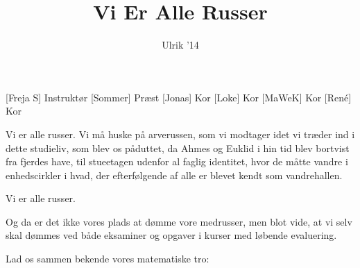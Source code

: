 \documentclass[a4paper,11pt]{article}
\title{Vi Er Alle Russer}
\author{Ulrik '14}
\begin{document}
\maketitle

\begin{roles}
[Freja S] Instruktør
[Sommer] Præst
[Jonas] Kor
[Loke] Kor
[MaWeK] Kor
[René] Kor
\end{roles}


\begin{sketch}


 Vi er alle russer.
Vi må huske på arverussen, som vi modtager idet vi træder ind i dette studieliv, som blev os påduttet, da Ahmes og Euklid i hin tid blev bortvist fra fjerdes have, til stueetagen udenfor al faglig identitet, hvor de måtte vandre i enhedscirkler i hvad, der efterfølgende af alle er blevet kendt som vandrehallen.

 Vi er alle russer.

 Og da er det ikke vores plads at dømme vore medrusser, men blot vide, at vi selv skal dømmes ved både eksaminer og opgaver i kurser med løbende evaluering.

 Lad os sammen bekende vores matematiske tro:



\end{sketch}
\end{document}

